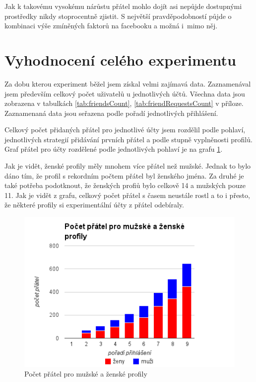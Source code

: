 \documentclass[thesis=M,czech]{FITthesis}[2013/05/10]
\begin{document}
Jak k takovému vysokému nárůstu přátel mohlo dojít asi nepůjde dostupnými prostředky nikdy stoprocentně zjistit. S největší pravděpodobností půjde o kombinaci výše zmíněných faktorů na facebooku a možná i~mimo něj.

\section{Vyhodnocení celého experimentu}

Za dobu kterou experiment běžel jsem získal velmi zajímavá data. Zaznamenával jsem především celkový počet uživatelů u jednotlivých účtů. Všechna data jsou zobrazena v tabulkách \ref{tab:friendsCount}, \ref{tab:friendRequestsCount} v příloze. Zaznamenaná data jsou seřazena podle pořadí jednotlivých přihlášení.

Celkový počet přidaných přátel pro jednotlivé účty jsem rozdělil podle pohlaví, jednotlivých strategií přidávání prvních přátel a podle stupně vyplněnosti profilů. Graf přátel pro účty rozdělené podle jednotlivých pohlaví je na grafu \ref{fig:gender}. 

Jak je vidět, ženské profily měly mnohem více přátel než mužské. Jednak to bylo dáno tím, že profil s rekordním počtem přátel byl ženského jména. Za druhé je také potřeba podotknout, že ženských profiů bylo celkově 14 a mužských pouze 11. Jak je vidět z grafu, celkový počet přátel s časem neustále rostl a to i přesto, že některé profily si experimentální účty z přátel odebíraly. 

\begin{figure}[h]
\begin{center}
\includegraphics[width=5in]{figures/gender.png}
\caption{Počet přátel pro mužské a ženské profily}
\label{fig:gender}
\end{center}
\end{figure}
\end{document}
